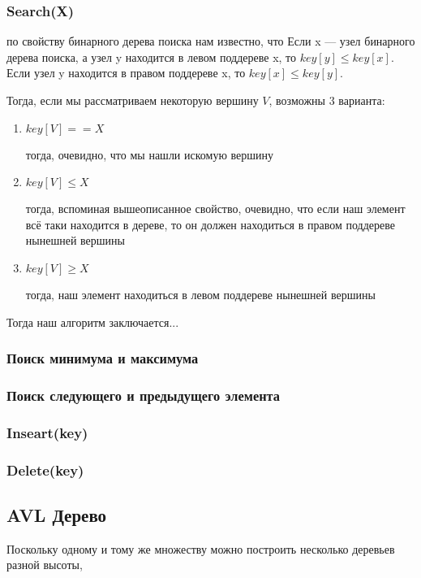 \subsubsection{Search(X)}
по свойству бинарного дерева поиска нам известно, что Если x — узел бинарного дерева поиска, а узел y находится в левом
поддереве x, то $key [y] \le  key [x]$. Если узел y находится в правом
поддереве x, то $key [x] \le  key [y]$.

Тогда, если мы рассматриваем некоторую вершину $V$, возможны 3 варианта:\par
\begin{enumerate}[]
	\item $key[V]==X$\par
	тогда, очевидно, что мы нашли искомую вершину
	\item $key[V] \le X$\par
	тогда, вспоминая вышеописанное свойство, очевидно, что если наш элемент всё таки находится в дереве, то он должен находиться в правом поддереве нынешней вершины
	\item $key[V] \ge X$\par 
	тогда, наш элемент находиться в левом поддереве нынешней вершины
\end{enumerate}\par

Тогда наш алгоритм заключается...

\begin{example}
	
\end{example}

\subsubsection{Поиск минимума и максимума}
\subsubsection{Поиск следующего и предыдущего элемента}
\subsubsection{Inseart(key)}
\subsubsection{Delete(key)}

\newpage

\subsection{AVL Дерево}
Поскольку одному и тому же множеству можно построить несколько деревьев разной высоты,





